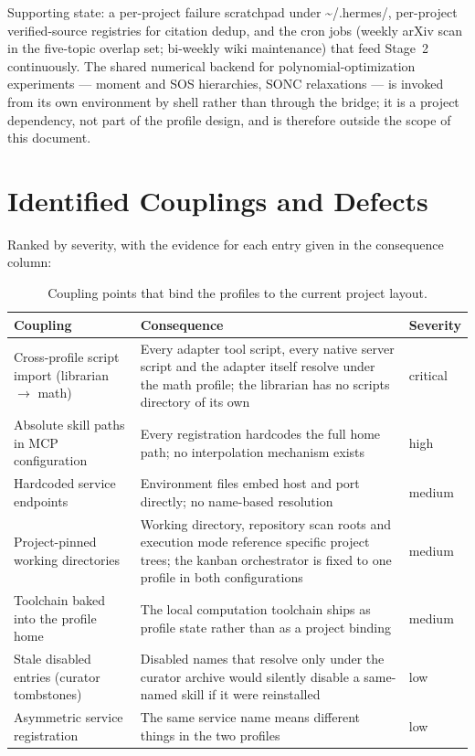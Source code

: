 \documentclass[10pt]{article}
\newcommand{\mono}[1]{{\ttfamily\small #1}}
\begin{document}
Supporting state: a per-project failure scratchpad under
\mono{\textasciitilde/.hermes/}\allowbreak\mono{profiles/math/}\allowbreak\mono{scratchpad/},
per-project verified-source registries for citation dedup, and the cron jobs (weekly arXiv scan in
the five-topic overlap set; bi-weekly wiki maintenance) that feed Stage~2 continuously. The shared
numerical backend for polynomial-optimization experiments --- moment and SOS hierarchies, SONC
relaxations --- is invoked from its own environment by shell rather than through the bridge; it is a
project dependency, not part of the profile design, and is therefore outside the scope of this
document.

\section{Identified Couplings and Defects}\label{sec:defects}

Ranked by severity, with the evidence for each entry given in the consequence column:

\begin{table}[H]
\centering\small
\caption{Coupling points that bind the profiles to the current project layout.}
\label{tab:couplings}
\renewcommand{\arraystretch}{1.2}
\begin{tabularx}{\textwidth}{@{}p{4.2cm} X l@{}}
\toprule
\textbf{Coupling} & \textbf{Consequence} & \textbf{Severity} \\
\midrule
Cross-profile script import (librarian $\to$ math) & Every adapter tool script, every native server script and the adapter itself resolve under the math profile; the librarian has no scripts directory of its own & critical \\
Absolute skill paths in MCP configuration & Every registration hardcodes the full home path; no interpolation mechanism exists & high \\
Hardcoded service endpoints & Environment files embed host and port directly; no name-based resolution & medium \\
Project-pinned working directories & Working directory, repository scan roots and execution mode reference specific project trees; the kanban orchestrator is fixed to one profile in both configurations & medium \\
Toolchain baked into the profile home & The local computation toolchain ships as profile state rather than as a project binding & medium \\
Stale disabled entries (curator tombstones) & Disabled names that resolve only under the curator archive would silently disable a same-named skill if it were reinstalled & low \\
Asymmetric service registration & The same service name means different things in the two profiles & low \\
\bottomrule
\end{tabularx}
\end{table}
\end{document}
